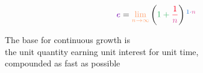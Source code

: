 \documentclass[preview]{standalone}
\newcommand{\plain}{\color{black}}
\begin{document}
\begin{center}

\newcommand{\growth}{\color{c1}}
\newcommand{\unitQuantity}{\color{c2}}
\newcommand{\unitInterest}{\color{c3}}
\newcommand{\unitTime}{\color{c4}}
\newcommand{\perfectly}{\color{c5}}
\newcommand{\compounded}{\color{c6}}

$$\growth e
\plain =
\perfectly \lim_{n\to\infty}
\plain \left(
\unitQuantity 1 + \unitInterest \frac{1}{\compounded n}
\plain \right)
\unitTime^{1 \cdot \compounded n}
$$

\growth       The base for continuous growth
\plain        is
\\
\unitQuantity the unit quantity 
\unitInterest earning unit interest
\unitTime     for unit time, 
\\
\compounded   compounded
\perfectly    as fast as possible

\end{center}
\end{document}
